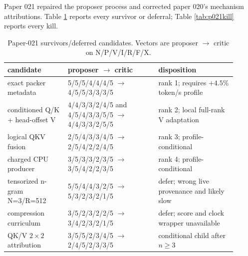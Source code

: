 \documentclass{article}
\begin{document}
Paper 021 repaired the proposer process and corrected paper 020's mechanism
attributions.  Table \ref{tab:p021keep} reports every survivor or deferral;
Table \ref{tab:p021kill} reports every kill.

\begin{table}[t]
\caption{Paper-021 survivors/deferred candidates.  Vectors are proposer
$\rightarrow$ critic on N/P/V/I/R/F/X.}
\label{tab:p021keep}
\centering\scriptsize
\begin{tabular}{p{0.24\linewidth}p{0.36\linewidth}p{0.31\linewidth}}
\toprule
candidate & proposer $\rightarrow$ critic & disposition\\
\midrule
exact packer metadata &
5/5/5/4/4/4/5 $\rightarrow$ 4/5/5/3/3/3/5 &
rank 1; requires $+4.5\%$ token/s profile\\
conditioned Q/K + head-offset V &
4/4/3/3/2/4/5 and 4/5/4/3/3/5/5 $\rightarrow$ 4/4/3/3/2/5/5 &
rank 2; local full-rank V adaptation\\
logical QKV fusion &
2/5/4/3/3/4/5 $\rightarrow$ 2/5/4/2/2/4/5 &
rank 3; profile-conditional\\
charged CPU producer &
3/5/3/3/2/3/5 $\rightarrow$ 3/5/4/2/2/3/5 &
rank 4; profile-conditional\\
tensorized n-gram N=3/R=512 &
5/5/4/4/3/2/5 $\rightarrow$ 5/3/2/3/2/1/5 &
defer; wrong live provenance and likely slow\\
compression curriculum &
3/5/2/3/2/2/5 $\rightarrow$ 3/4/2/3/2/1/5 &
defer; score and clock wrapper unavailable\\
QK/V $2\times2$ attribution &
3/5/5/2/3/4/5 $\rightarrow$ 2/4/5/2/3/3/5 &
conditional child after $n\geq3$\\
\bottomrule
\end{tabular}
\end{table}
\end{document}
